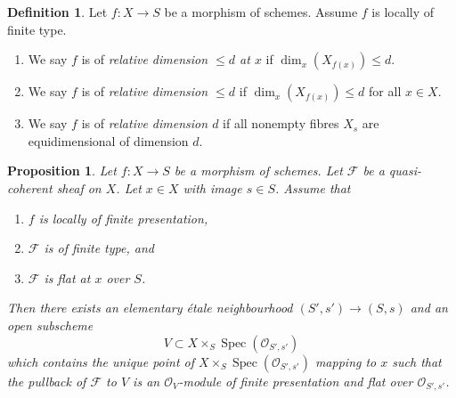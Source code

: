 \documentclass{amsart}
\theoremstyle{plain}
\newtheorem{proposition}[subsection]{Proposition}
\theoremstyle{definition}
\newtheorem{definition}[subsection]{Definition}
\theoremstyle{remark}
\numberwithin{equation}{subsection}
\def\Spec{\mathop{\mathrm{Spec}}}
\begin{document}
\begin{definition}
\label{morphisms-definition-relative-dimension-d}
Let $f : X \to S$ be a morphism of schemes.
Assume $f$ is locally of finite type.
\begin{enumerate}
\item We say $f$ is of {\it relative dimension $\leq d$ at $x$} if
$\dim_x(X_{f(x)}) \leq d$.
\item We say $f$ is of {\it relative dimension $\leq d$} if
$\dim_x(X_{f(x)}) \leq d$ for all $x \in X$.
\item We say $f$ is of {\it relative dimension $d$} if
all nonempty fibres $X_s$ are equidimensional of dimension $d$.
\end{enumerate}
\end{definition}

\begin{proposition}
\label{proposition-finite-type-flat-at-point}
Let $f : X \to S$ be a morphism of schemes.
Let $\mathcal{F}$ be a quasi-coherent sheaf on $X$.
Let $x \in X$ with image $s \in S$.
Assume that
\begin{enumerate}
\item $f$ is locally of finite presentation,
\item $\mathcal{F}$ is of finite type, and
\item $\mathcal{F}$ is flat at $x$ over $S$.
\end{enumerate}
Then there exists an elementary \'etale neighbourhood $(S', s') \to (S, s)$
and an open subscheme
$$
V \subset X \times_S \Spec(\mathcal{O}_{S', s'})
$$
which contains the unique point of
$X \times_S \Spec(\mathcal{O}_{S', s'})$ mapping to $x$
such that the pullback of $\mathcal{F}$ to $V$ is an $\mathcal{O}_V$-module
of finite presentation and flat over $\mathcal{O}_{S', s'}$.
\end{proposition}
\end{document}
